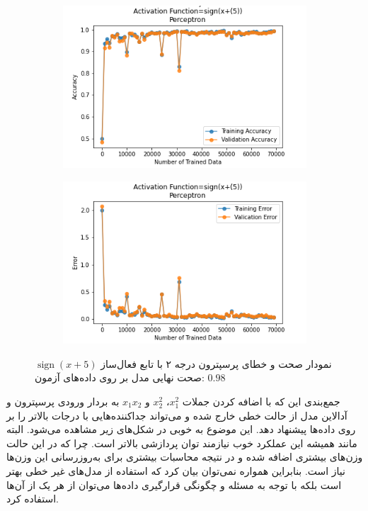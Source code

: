 \documentclass[12pt, a4paper]{article}
\DeclareMathOperator{\sign}{sign}
\begin{document}
\begin{figure}[!h]
    \begin{subfigure}{0.45\linewidth}
        \centering
        \includegraphics[width=\linewidth]{images/6/perceptron/activation_func/3.png}
    \end{subfigure}
    \hfil
    \begin{subfigure}{0.45\linewidth}
        \centering
        \includegraphics[width=\linewidth]{images/6/perceptron/activation_func/4.png}
    \end{subfigure}
    \caption{نمودار صحت و خطای پرسپترون درجه ۲ با تابع فعال‌ساز $\sign(x+5)$
    \newline
    صحت نهایی مدل بر روی داده‌های آزمون: $0.98$}
\end{figure}

\clearpage

جمع‌بندی این که با اضافه کردن جملات $x_1^2$، $x_2^2$ و $x_1x_2$ به بردار ورودی پرسپترون و آدالاین
مدل از حالت خطی خارج شده و می‌تواند جداکننده‌هایی با درجات بالاتر را بر روی داده‌ها پیشنهاد دهد.
این موضوع به خوبی در شکل‌های زیر مشاهده می‌شود. البته مانند همیشه این عملکرد خوب نیازمند توان پردازشی
بالاتر است. چرا که در این حالت وزن‌های بیشتری اضافه شده و در نتیجه محاسبات بیشتری برای به‌روزرسانی
این وزن‌ها نیاز است. بنابراین همواره نمی‌توان بیان کرد که استفاده از مدل‌های غیر خطی بهتر است بلکه
با توجه به مسئله و چگونگی قرارگیری داده‌ها می‌توان از هر یک از آن‌ها استفاده کرد.
\end{document}
